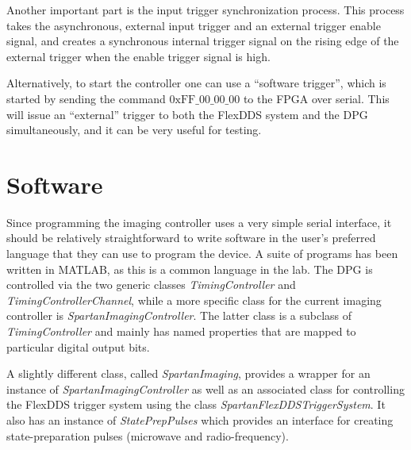 \documentclass[]{article}
\begin{document}
Another important part is the input trigger synchronization process.  This process takes the asynchronous, external input trigger and an external trigger enable signal, and creates a synchronous internal trigger signal on the rising edge of the external trigger when the enable trigger signal is high.  

Alternatively, to start the controller one can use a ``software trigger'', which is started by sending the command $0\mathrm{x}\mathrm{FF}\_00\_00\_00$ to the FPGA over serial.  This will issue an ``external'' trigger to both the FlexDDS system and the DPG simultaneously, and it can be very useful for testing.

\section{Software}
\label{sec:software}
Since programming the imaging controller uses a very simple serial interface, it should be relatively straightforward to write software in the user's preferred language that they can use to program the device.  A suite of programs has been written in MATLAB, as this is a common language in the lab.  The DPG is controlled via the two generic classes \emph{TimingController} and \emph{TimingControllerChannel}, while a more specific class for the current imaging controller is \emph{SpartanImagingController}.  The latter class is a subclass of \emph{TimingController} and mainly has named properties that are mapped to particular digital output bits.  

A slightly different class, called \emph{SpartanImaging}, provides a wrapper for an instance of \emph{SpartanImagingController} as well as an associated class for controlling the FlexDDS trigger system using the class \emph{SpartanFlexDDSTriggerSystem}.  It also has an instance of \emph{StatePrepPulses} which provides an interface for creating state-preparation pulses (microwave and radio-frequency).  
\end{document}
